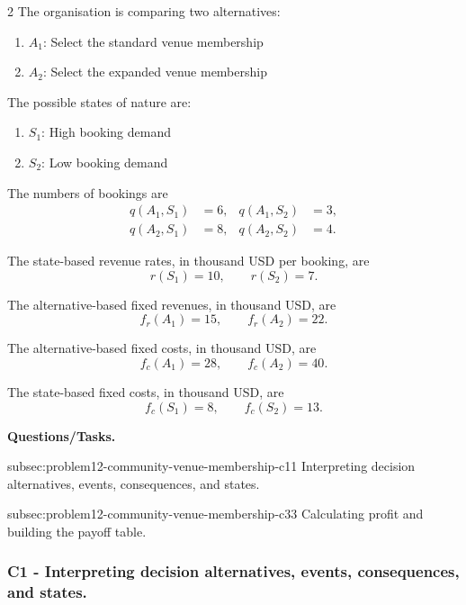 \begin{multicols}{2}
	The organisation is comparing two alternatives:
	\begin{enumerate}[label=\arabic*.]
		\item \(A_1\): Select the standard venue membership
		\item \(A_2\): Select the expanded venue membership
	\end{enumerate}
	
	The possible states of nature are:
	\begin{enumerate}[label=\arabic*.]
		\item \(S_1\): High booking demand
		\item \(S_2\): Low booking demand
	\end{enumerate}
	
	\columnbreak
	
	The numbers of bookings are
	\[
	\begin{aligned}
		q(A_1,S_1)&=6,
		&
		q(A_1,S_2)&=3,
		\\
		q(A_2,S_1)&=8,
		&
		q(A_2,S_2)&=4.
	\end{aligned}
	\]
	
	The state-based revenue rates, in thousand USD per booking, are
	\[
	r(S_1)=10,
	\qquad
	r(S_2)=7.
	\]
	
	The alternative-based fixed revenues, in thousand USD, are
	\[
	f_r(A_1)=15,
	\qquad
	f_r(A_2)=22.
	\]
	
	The alternative-based fixed costs, in thousand USD, are
	\[
	f_c(A_1)=28,
	\qquad
	f_c(A_2)=40.
	\]
	
	The state-based fixed costs, in thousand USD, are
	\[
	f_c(S_1)=8,
	\qquad
	f_c(S_2)=13.
	\]
\end{multicols}

\textbf{Questions/Tasks.}
\begin{enumerate}
	\CriterionTask
	{subsec:problem12-community-venue-membership-c1}{1}
	{Interpreting decision alternatives, events, consequences, and states.}

	\CriterionTask
	{subsec:problem12-community-venue-membership-c3}{3}
	{Calculating profit and building the payoff table.}
\end{enumerate}

\subsubsection*{C1 - Interpreting decision alternatives, events, consequences, and states.}
\label{subsec:problem12-community-venue-membership-c1}

